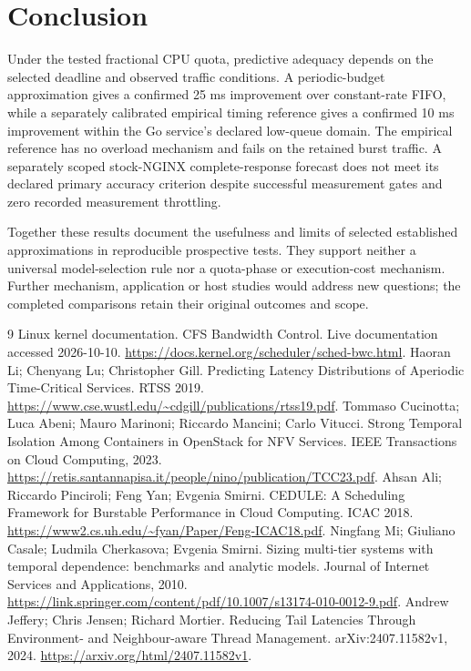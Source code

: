 \documentclass[11pt,a4paper]{article}
\begin{document}
\section{Conclusion}

Under the tested fractional CPU quota, predictive adequacy depends on the
selected deadline and observed traffic conditions. A periodic-budget
approximation gives a confirmed 25 ms improvement over constant-rate FIFO,
while a separately calibrated empirical timing reference gives a confirmed
10 ms improvement within the Go service's declared low-queue domain. The
empirical reference has no overload mechanism and fails on the retained burst
traffic. A separately scoped stock-NGINX complete-response forecast does not
meet its declared primary accuracy criterion despite successful measurement
gates and zero recorded measurement throttling.

Together these results document the usefulness and limits of selected
established approximations in reproducible prospective tests. They support
neither a universal model-selection rule nor a quota-phase or execution-cost
mechanism. Further mechanism, application or host studies would address new
questions; the completed comparisons retain their original outcomes and scope.

\begin{thebibliography}{9}
 Linux kernel documentation. CFS Bandwidth Control. Live documentation accessed 2026-10-10. \url{https://docs.kernel.org/scheduler/sched-bwc.html}.
 Haoran Li; Chenyang Lu; Christopher Gill. Predicting Latency Distributions of Aperiodic Time-Critical Services. RTSS 2019. \url{https://www.cse.wustl.edu/~cdgill/publications/rtss19.pdf}.
 Tommaso Cucinotta; Luca Abeni; Mauro Marinoni; Riccardo Mancini; Carlo Vitucci. Strong Temporal Isolation Among Containers in OpenStack for NFV Services. IEEE Transactions on Cloud Computing, 2023. \url{https://retis.santannapisa.it/people/nino/publication/TCC23.pdf}.
 Ahsan Ali; Riccardo Pinciroli; Feng Yan; Evgenia Smirni. CEDULE: A Scheduling Framework for Burstable Performance in Cloud Computing. ICAC 2018. \url{https://www2.cs.uh.edu/~fyan/Paper/Feng-ICAC18.pdf}.
 Ningfang Mi; Giuliano Casale; Ludmila Cherkasova; Evgenia Smirni. Sizing multi-tier systems with temporal dependence: benchmarks and analytic models. Journal of Internet Services and Applications, 2010. \url{https://link.springer.com/content/pdf/10.1007/s13174-010-0012-9.pdf}.
 Andrew Jeffery; Chris Jensen; Richard Mortier. Reducing Tail Latencies Through Environment- and Neighbour-aware Thread Management. arXiv:2407.11582v1, 2024. \url{https://arxiv.org/html/2407.11582v1}.
\end{thebibliography}
\end{document}
